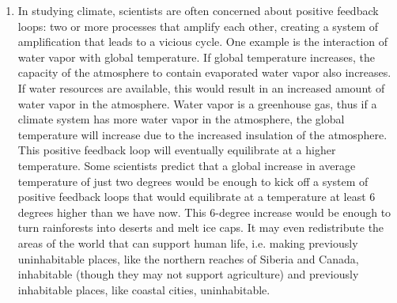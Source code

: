 \begin{enumerate}
\item In studying climate, scientists are often concerned about positive feedback loops: two or more processes that amplify each other, creating a system of amplification that leads to a vicious cycle. One example is the interaction of water vapor with global temperature. If global temperature increases, the capacity of the atmosphere to contain evaporated water vapor also increases. If water resources are available, this would result in an increased amount of water vapor in the atmosphere. Water vapor is a greenhouse gas, thus if a climate system has more water vapor in the atmosphere, the global temperature will increase due to the increased insulation of the atmosphere. This positive feedback loop will eventually equilibrate at a higher temperature. Some scientists predict that a global increase in average temperature of just two degrees would be enough to kick off a system of positive feedback loops that would equilibrate at a temperature at least 6 degrees higher than we have now. This 6-degree increase would be enough to turn rainforests into deserts and melt ice caps. It may even redistribute the areas of the world that can support human life, i.e. making previously uninhabitable places, like the northern reaches of Siberia and Canada, inhabitable (though they may not support agriculture) and previously inhabitable places, like coastal cities, uninhabitable. \label{08problem4}


\end{enumerate}
